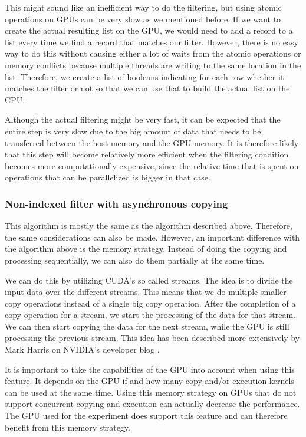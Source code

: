 \documentclass[a4paper,titlepage]{article}
\begin{document}
This might sound like an inefficient way to do the filtering, but using atomic operations on GPUs can be very slow as we mentioned before. If we want to create the actual resulting list on the GPU, we would need to add a record to a list every time we find a record that matches our filter. However, there is no easy way to do this without causing either a lot of waits from the atomic operations or memory conflicts because multiple threads are writing to the same location in the list. Therefore, we create a list of booleans indicating for each row whether it matches the filter or not so that we can use that to build the actual list on the CPU.

Although the actual filtering might be very fast, it can be expected that the entire step is very slow due to the big amount of data that needs to be transferred between the host memory and the GPU memory. It is therefore likely that this step will become relatively more efficient when the filtering condition becomes more computationally expensive, since the relative time that is spent on operations that can be parallelized is bigger in that case.

\subsubsection{Non-indexed filter with asynchronous copying}
This algorithm is mostly the same as the algorithm described above. Therefore, the same considerations can also be made. However, an important difference with the algorithm above is the memory strategy. Instead of doing the copying and processing sequentially, we can also do them partially at the same time.

We can do this by utilizing CUDA's so called streams. The idea is to divide the input data over the different streams. This means that we do multiple smaller copy operations instead of a single big copy operation. After the completion of a copy operation for a stream, we start the processing of the data for that stream. We can then start copying the data for the next stream, while the GPU is still processing the previous stream. This idea has been described more extensively by Mark Harris on NVIDIA's developer blog \cite{cuda-overlap-streams}.

It is important to take the capabilities of the GPU into account when using this feature. It depends on the GPU if and how many copy and/or execution kernels can be used at the same time. Using this memory strategy on GPUs that do not support concurrent copying and execution can actually decrease the performance. The GPU used for the experiment does support this feature and can therefore benefit from this memory strategy.
\end{document}
